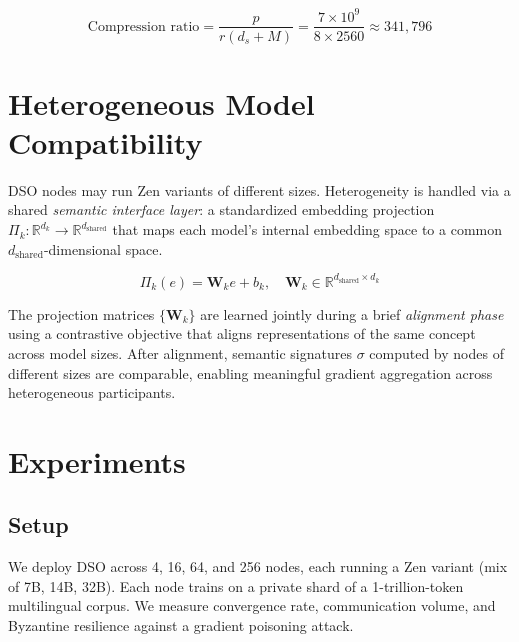\documentclass[11pt,a4paper]{article}
\begin{document}
\begin{equation}
    \text{Compression ratio} = \frac{p}{r(d_s + M)} = \frac{7 \times 10^9}{8 \times 2560}
    \approx 341{,}796
    \label{eq:compression}
\end{equation}

\section{Heterogeneous Model Compatibility}
\label{sec:heterogeneous}

DSO nodes may run Zen variants of different sizes. Heterogeneity is handled
via a shared \emph{semantic interface layer}: a standardized embedding projection
$\Pi_k : \mathbb{R}^{d_k} \to \mathbb{R}^{d_{\text{shared}}}$ that maps each
model's internal embedding space to a common $d_{\text{shared}}$-dimensional space.

\begin{equation}
    \Pi_k(e) = \mathbf{W}_k e + b_k, \quad \mathbf{W}_k \in \mathbb{R}^{d_{\text{shared}} \times d_k}
    \label{eq:projection}
\end{equation}

The projection matrices $\{\mathbf{W}_k\}$ are learned jointly during a brief
\emph{alignment phase} using a contrastive objective that aligns representations of
the same concept across model sizes. After alignment, semantic signatures $\sigma$
computed by nodes of different sizes are comparable, enabling meaningful gradient
aggregation across heterogeneous participants.

\section{Experiments}
\label{sec:experiments}

\subsection{Setup}

We deploy DSO across 4, 16, 64, and 256 nodes, each running a Zen variant
(mix of 7B, 14B, 32B). Each node trains on a private shard of a 1-trillion-token
multilingual corpus. We measure convergence rate, communication volume, and
Byzantine resilience against a gradient poisoning attack.
\end{document}
